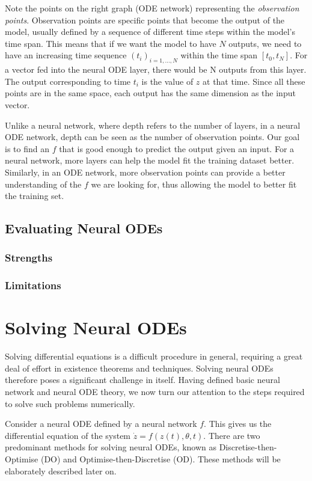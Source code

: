 \documentclass[a4paper,11pt,titlepage]{article}
\theoremstyle{definition}
\theoremstyle{plain}
\theoremstyle{remark}
\begin{document}
Note the points on the right graph (ODE network) representing the \textit{observation points}. Observation points are specific points that become the output of the model, usually defined by a sequence of different time steps within the model's time span. This means that if we want the model to have $N$ outputs, we need to have an increasing time sequence $(t_i)_{i=1,\dots ,N}$ within the time span $[t_0,t_N]$. For a vector fed into the neural ODE layer, there would be N outputs from this layer. The output corresponding to time $t_i$ is the value of $z$ at that time. Since all these points are in the same space, each output has the same dimension as the input vector.

Unlike a neural network, where depth refers to the number of layers, in a neural ODE network, depth can be seen as the number of observation points. Our goal is to find an $f$ that is good enough to predict the output given an input. For a neural network, more layers can help the model fit the training dataset better. Similarly, in an ODE network, more observation points can provide a better understanding of the $f$ we are looking for, thus allowing the model to better fit the training set.

\subsection{Evaluating Neural ODEs}
\subsubsection{Strengths}

\subsubsection{Limitations}

\pagebreak
\section{Solving Neural ODEs}
\label{sec:solvingNODEs}

Solving differential equations is a difficult procedure in general, requiring a great deal of effort in existence theorems and techniques. Solving neural ODEs therefore poses a significant challenge in itself. Having defined basic neural network and neural ODE theory, we now turn our attention to the steps required to solve such problems numerically.

Consider a neural ODE defined by a neural network $f$. This gives us the differential equation of the system $\dot{z}=f(z(t),\theta,t)$. There are two predominant methods for solving neural ODEs, known as Discretise-then-Optimise (DO) and Optimise-then-Discretise (OD). These methods will be elaborately described later on.
\end{document}
